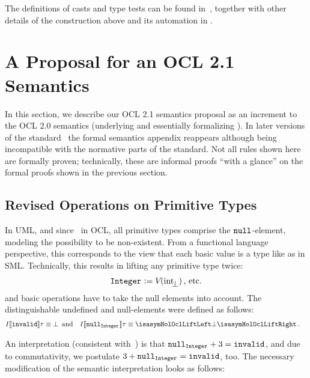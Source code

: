 The definitions of casts and type tests can be found
in~\cite{brucker.ea:extensible:2008-b}, together with other details of the
construction above and its automation in \holocl.

\section{A Proposal for an OCL 2.1 Semantics}\label{sec:hol-ocl2-semantics}
In this section, we describe our OCL 2.1 semantics proposal as an increment to
the OCL 2.0 semantics (underlying \holocl and essentially formalizing
\cite[Annex A]{omg:ocl:2003}). In later versions of the
standard~\cite{omg:ocl:2006} the formal semantics appendix reappears although
being incompatible with the normative parts of the standard.  Not all rules
shown here are formally proven; technically, these are informal proofs ``with a
glance'' on the formal proofs shown in the previous section.

\subsection{Revised Operations on Primitive Types}
In UML, and since~\cite{omg:ocl:2006} in OCL, all primitive types comprise the
$\Null{}$-element, modeling the possibility to be non-existent. From a
functional language perspective, this corresponds to the view that each basic
value is a type like  as in SML. Technically, this
results in lifting any primitive type twice:
\begin{gather*}
  \OclInteger[]  \defeq \V{}{\up{\HolInteger}}\mi{, etc.}
\end{gather*}
and basic operations have to take the null elements into account. The
distinguishable undefined and null-elements were defined as follows:
\begin{align*}
 I\semantics{\OclUndef}\tau \equiv \bottom  &\mi{ and}  \quad
 I\semantics{\Null{\OclInteger[]}}\tau \equiv \lift{\bottom}\mi{.}
\end{align*}

An interpretation (consistent with~\cite{omg:ocl:2006}) is that
$\Null{\OclInteger[]} + 3 = \isasymOclInvalid$, and due to commutativity, we
postulate $3 + \Null{\OclInteger[]} = \isasymOclInvalid$, too.  The necessary
modification of the semantic interpretation looks as follows:

